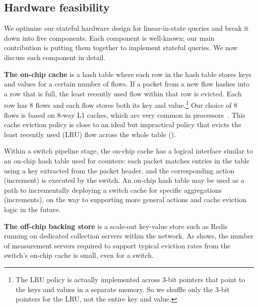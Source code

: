 \subsection{Hardware feasibility}
\label{sec:hardware-feasibility}
We optimize our stateful hardware design for linear-in-state queries and break
it down into five components.  Each component is well-known; our main
contribution is putting them together to implement stateful queries.
We now discuss each component in detail.

\textbf{The on-chip cache} is a hash table where each row in the hash table
stores keys and values for a certain number of flows. If a packet from a new
flow hashes into a row that is full, the least recently used flow within that
row is evicted. Each row has 8 flows and each flow stores both its key and
value.\footnote{The LRU policy is actually implemented across 3-bit pointers
that point to the keys and values in a separate memory. So we shuffle only the
3-bit pointers for the LRU, not the entire key and value.} Our choice of 8
flows is based on 8-way L1 caches, which are very common in
processors~\cite{intel_opt_manual}. This cache eviction policy is close to an
ideal but impractical policy that evicts the least recently used (LRU) flow
across the whole table ().

Within a switch pipeline stage, the on-chip cache has a logical interface
similar to an on-chip hash table used for counters:
each packet matches entries in the table using a key
extracted from the packet header, and the corresponding action (\ie increment)
is executed by the switch.
%
An on-chip hash table may be used as a path to incrementally deploying a switch
cache for specific aggregations (\eg increments), on the way to supporting
more general actions and cache eviction logic in the future.

\textbf{The off-chip backing store} is a scale-out key-value store such as
Redis~\cite{redis} running on dedicated collection servers within the network. As 
shows, the number of measurement servers required to support typical eviction
rates from the switch's on-chip cache is small, even for a \hundredgswitch switch.

